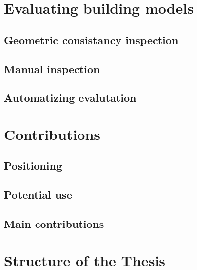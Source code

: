 \section{Evaluating building models}
    \subsection{Geometric consistancy inspection}
    \subsection{Manual inspection}
    \subsection{Automatizing evalutation}
\section{Contributions}
    \subsection{Positioning}
    \subsection{Potential use}
    \subsection{Main contributions}
\section{Structure of the Thesis}
